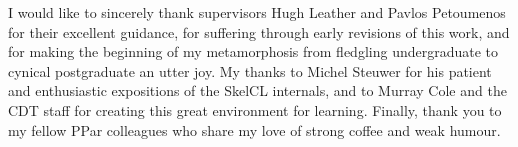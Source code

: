 I would like to sincerely thank supervisors Hugh Leather and Pavlos
Petoumenos for their excellent guidance, for suffering through early
revisions of this work, and for making the beginning of my
metamorphosis from fledgling undergraduate to cynical postgraduate an
utter joy. My thanks to Michel Steuwer for his patient and
enthusiastic expositions of the SkelCL internals, and to Murray Cole
and the CDT staff for creating this great environment for
learning. Finally, thank you to my fellow PPar colleagues who share my
love of strong coffee and weak humour.
